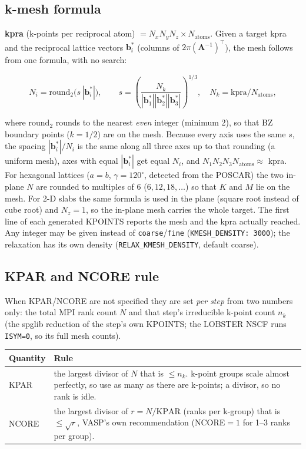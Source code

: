 \documentclass[11pt,a4paper]{scrartcl}
\newcommand{\thead}{\rowcolor{lightblue}}
\begin{document}
\subsection{k-mesh formula}
\label{app:kmesh}

\medskip
\textbf{kpra} (k-points per reciprocal atom) $= N_x N_y N_z \times N_\mathrm{atoms}$.
Given a target kpra and the reciprocal lattice vectors $\mathbf{b}_i^*$
(columns of $2\pi(\mathbf{A}^{-1})^\top$), the mesh follows from one formula,
with no search:

\[
  N_i = \mathrm{round}_{2}\bigl(s \, |\mathbf{b}_i^*|\bigr), \qquad
  s = \left(\frac{N_k}{|\mathbf{b}_1^*||\mathbf{b}_2^*||\mathbf{b}_3^*|}\right)^{1/3},
  \quad N_k = \mathrm{kpra}/N_\mathrm{atoms},
\]

where $\mathrm{round}_2$ rounds to the nearest \emph{even} integer (minimum 2),
so that BZ boundary points ($k = 1/2$) are on the mesh.  Because every axis
uses the same $s$, the spacing $|\mathbf{b}_i^*|/N_i$ is the same along all
three axes up to that rounding (a uniform mesh), axes with equal
$|\mathbf{b}_i^*|$ get equal $N_i$, and $N_1N_2N_3N_\mathrm{atoms}\approx$ kpra.
For hexagonal lattices ($a=b$, $\gamma=120^\circ$, detected from the POSCAR)
the two in-plane $N$ are rounded to multiples of 6 ($6,12,18,\dots$) so that
$K$ and $M$ lie on the mesh.  For 2-D slabs the same formula is used in the
plane (square root instead of cube root) and $N_z = 1$, so the in-plane mesh carries the
whole target.  The first line of each generated KPOINTS reports the mesh and
the kpra actually reached.  Any integer may be given instead of
\texttt{coarse}/\texttt{fine} (\texttt{KMESH\_DENSITY: 3000}); the relaxation
has its own density (\texttt{RELAX\_KMESH\_DENSITY}, default coarse).

\subsection{KPAR and NCORE rule}
\label{app:kpar}

When KPAR/NCORE are not specified they are set \emph{per step} from two
numbers only: the total MPI rank count $N$ and that step's irreducible
k-point count $n_k$ (the spglib reduction of the step's own KPOINTS; the
LOBSTER NSCF runs \texttt{ISYM=0}, so its full mesh counts).

\begin{tabularx}{\linewidth}{@{}lX@{}}
\thead
Quantity & Rule \\ \midrule
KPAR & the largest divisor of $N$ that is ${}\le n_k$.  k-point groups scale
  almost perfectly, so use as many as there are k-points; a divisor, so no rank
  is idle. \\
NCORE & the largest divisor of $r = N/\mathrm{KPAR}$ (ranks per k-group) that
  is ${}\le \sqrt{r}$, VASP's own recommendation (NCORE${}=1$ for 1--3 ranks
  per group). \\
\bottomrule
\end{tabularx}
\end{document}
